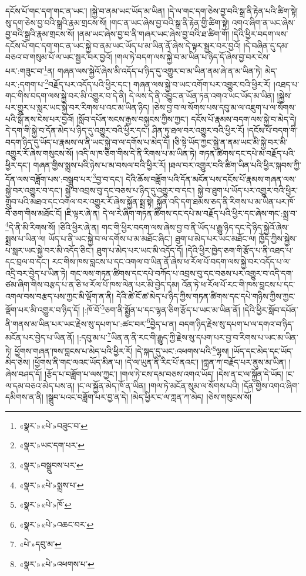 དངོས་པོ་གང་དག་གང་ན་ཡང་། །སྐྱེ་བ་ནམ་ཡང་ཡོད་མ་ཡིན། །དེ་ལ་གང་དག་ཅེས་བྱ་བའི་སྒྲ་ནི་རྟེན་པའི་ཚིག་སྟེ། སུ་དག་ཅེས་བྱ་བའི་སྒྲའི་རྣམ་གྲངས་སོ། །གང་ན་ཡང་ཞེས་བྱ་བའི་སྒྲ་ནི་རྟེན་གྱི་ཚིག་སྟེ། འགའ་ཞིག་ན་ཡང་ཞེས་བྱ་བའི་སྒྲའི་རྣམ་གྲངས་སོ། །ནམ་ཡང་ཞེས་བྱ་བ་ནི་གཞར་ཡང་ཞེས་བྱ་བའི་ཐ་ཚིག་གོ། །དེའི་ཕྱིར་བདག་ལས་དངོས་པོ་གང་དག་གང་ན་ཡང་སྐྱེ་བ་ནམ་ཡང་ཡོད་པ་མ་ཡིན་ནོ་ཞེས་དེ་ལྟར་སྦྱར་བར་བྱའོ། །དེ་བཞིན་དུ་དམ་བཅའ་བ་གསུམ་པོ་ལ་ཡང་སྦྱར་བར་བྱའོ། །གལ་ཏེ་བདག་ལས་སྐྱེ་བ་མ་ཡིན་པ་ཉིད་དོ་ཞེས་བྱ་བར་ངེས་པར་:གཟུང་བ་\footnote{«སྣར་»«པེ་»བཟུང་བ་}ན། གཞན་ལས་སྐྱེའོ་ཞེས་མི་འདོད་པ་ཉིད་དུ་འགྱུར་བ་མ་ཡིན་ནམ་ཞེ་ན་མ་ཡིན་ཏེ། མེད་པར་:དགག་པ་\footnote{«སྣར་»ཡང་དག་པར་}བརྗོད་པར་འདོད་པའི་ཕྱིར་དང་། གཞན་ལས་སྐྱེ་བ་ཡང་འགོག་པར་འགྱུར་བའི་ཕྱིར་རོ། །འཐད་པ་གང་གིས་བདག་ལས་སྐྱེ་བར་མི་འགྱུར་བ་དེ་ནི། དེ་ལས་དེ་ནི་འབྱུང་ན་ཡོན་ཏན་འགའ་ཡང་ཡོད་མ་ཡིན། །སྐྱེས་པར་གྱུར་པ་སླར་ཡང་སྐྱེ་བར་རིགས་པ་འང་མ་ཡིན་ཉིད། །ཅེས་བྱ་བ་ལ་སོགས་པས་དབུ་མ་ལ་འཇུག་པ་ལ་སོགས་པའི་སྒོ་ནས་ངེས་པར་བྱའོ། །སློབ་དཔོན་སངས་རྒྱས་བསྐྱངས་ཀྱིས་ཀྱང་། དངོས་པོ་རྣམས་བདག་ལས་སྐྱེ་བ་མེད་དེ། དེ་དག་གི་སྐྱེ་བ་དོན་མེད་པ་ཉིད་དུ་འགྱུར་བའི་ཕྱིར་དང་། ཤིན་ཏུ་ཐལ་བར་འགྱུར་བའི་ཕྱིར་རོ། །དངོས་པོ་བདག་གི་བདག་ཉིད་དུ་ཡོད་པ་རྣམས་ལ་ནི་ཡང་སྐྱེ་བ་ལ་དགོས་པ་མེད་དོ། །ཅི་སྟེ་ཡོད་ཀྱང་སྐྱེ་ན་ནམ་ཡང་མི་སྐྱེ་བར་མི་འགྱུར་རོ་ཞེས་གསུངས་སོ། །འདི་ལ་ཁ་ཅིག་གིས་དེ་ནི་རིགས་པ་མ་ཡིན་ཏེ། གཏན་ཚིགས་དང་དཔེ་མ་བརྗོད་པའི་ཕྱིར་དང་། གཞན་གྱིས་སྨྲས་པའི་ཉེས་པ་མ་བསལ་བའི་ཕྱིར་རོ། །ཐལ་བར་འགྱུར་བའི་ཚིག་ཡིན་པའི་ཕྱིར་སྐབས་ཀྱི་དོན་ལས་བཟློག་པས་:བསྒྲུབ་པར་\footnote{«སྣར་»བསྒྲུབས་པར་}བྱ་བ་དང་། དེའི་ཆོས་བཟློག་པའི་དོན་མངོན་པས་དངོས་པོ་རྣམས་གཞན་ལས་སྐྱེ་བར་འགྱུར་བ་དང་། སྐྱེ་བ་འབྲས་བུ་དང་བཅས་པ་ཉིད་དུ་འགྱུར་བ་དང་། སྐྱེ་བ་ཐུག་པ་ཡོད་པར་འགྱུར་བའི་ཕྱིར་གྲུབ་པའི་མཐའ་དང་འགལ་བར་འགྱུར་རོ་ཞེས་སྐྱོན་སྨྲ་སྟེ། སྐྱོན་འདི་དག་ཐམས་ཅད་ནི་རིགས་པ་མ་ཡིན་པར་ཁོ་བོ་ཅག་གིས་མཐོང་ངོ། །ཇི་ལྟར་ཞེ་ན། དེ་ལ་རེ་ཞིག་གཏན་ཚིགས་དང་དཔེ་མ་བརྗོད་པའི་ཕྱིར་དང་ཞེས་གང་:སྨྲ་བ་\footnote{«སྣར་»«པེ་»སྨྲས་པ་}དེ་ནི་མི་རིགས་སོ། །ཅིའི་ཕྱིར་ཞེ་ན། གང་གི་ཕྱིར་བདག་ལས་ཞེས་བྱ་བ་ནི་ཡོད་པ་རྒྱུ་ཉིད་དང་དེ་ཉིད་སྐྱེའོ་ཞེས་སྨྲས་པ་ཡིན་ལ། ཡོད་པ་ནི་ཡང་སྐྱེ་བ་ལ་དགོས་པ་མ་མཐོང་ཞིང་། ཐུག་པ་མེད་པར་ཡང་མཐོང་ལ། ཁྱོད་ཀྱིས་སྐྱེས་པ་སླར་ཡང་སྐྱེ་བར་མི་འདོད་ཅིང་། ཐུག་པ་མེད་པར་ཡང་མི་འདོད་དོ། །དེའི་ཕྱིར་ཁྱེད་ཅག་གི་རྩོད་པ་ནི་འཐད་པ་དང་བྲལ་བ་དང་། རང་གིས་ཁས་བླངས་པ་དང་འགལ་བ་ཡིན་ནོ་ཞེས་ཕ་རོལ་པོ་བདག་ལས་སྐྱེ་བར་འདོད་པ་ལ་འདྲི་བར་བྱེད་པ་ཡིན་ཏེ། གང་ལས་གཏན་ཚིགས་དང་དཔེ་བཀོད་པ་འབྲས་བུ་དང་བཅས་པར་འགྱུར་བ་འདི་དག་ཙམ་ཞིག་གིས་བརྩད་པ་ན་ཅི་ཕ་རོལ་པོ་ཁས་ལེན་པར་མི་བྱེད་དམ། འོན་ཏེ་ཕ་རོལ་པོ་རང་གི་ཁས་བླངས་པ་དང་འགལ་བས་བརྩད་པས་ཀྱང་མི་ལྡོག་ན་ནི། དེའི་ཚེ་ངོ་ཚ་མེད་པ་ཉིད་ཀྱིས་གཏན་ཚིགས་དང་དཔེ་གཉིས་ཀྱིས་ཀྱང་ལྡོག་པར་མི་འགྱུར་བ་ཉིད་དོ། །:ཁོ་བོ་\footnote{«སྣར་»«པེ་»ཁོ་}ཅག་ནི་སྨྱོན་པ་དང་ལྷན་ཅིག་རྩོད་པ་ཡང་མ་ཡིན་ནོ། །དེའི་ཕྱིར་སློབ་དཔོན་ནི་གནས་མ་ཡིན་པར་ཡང་རྗེས་སུ་དཔག་པ་:ཚང་བར་\footnote{«སྣར་»«པེ་»འཆང་བར་}བྱེད་པ་ན། བདག་ཉིད་རྗེས་སུ་དཔག་པ་ལ་དགའ་བ་ཉིད་མངོན་པར་བྱེད་པ་ཡིན་ནོ། །:དབུ་མ་པ་\footnote{«པེ་»དབུ་མ་}ཡིན་ན་ནི་རང་གི་རྒྱུད་ཀྱི་རྗེས་སུ་དཔག་པར་བྱ་བ་རིགས་པ་ཡང་མ་ཡིན་ཏེ། ཕྱོགས་གཞན་ཁས་བླངས་པ་མེད་པའི་ཕྱིར་རོ། །དེ་སྐད་དུ་ཡང་:འཕགས་པའི་\footnote{«སྣར་»«པེ་»འཕགས་པ་}ལྷས། །ཡོད་དང་མེད་དང་ཡོད་མེད་ཅེས། །ཕྱོགས་ནི་གང་ལའང་ཡོད་མིན་པ། །དེ་ལ་ཡུན་ནི་རིང་པོ་ནའང་། །ཀླན་ཀ་བརྗོད་པར་ནུས་མ་ཡིན། །ཞེས་བཤད་དོ། །རྩོད་པ་བཟློག་པ་ལས་ཀྱང་། །གལ་ཏེ་ངས་དམ་བཅས་འགའ་ཡོད། །དེས་ན་ང་ལ་སྐྱོན་དེ་ཡོད། །ང་ལ་དམ་བཅའ་མེད་པས་ན། །ང་ལ་སྐྱོན་མེད་ཁོ་ན་ཡིན། །གལ་ཏེ་མངོན་སུམ་ལ་སོགས་པའི། །དོན་གྱིས་འགའ་ཞིག་དམིགས་ན་ནི། །སྒྲུབ་པའང་བཟློག་པར་བྱ་ན་དེ། །མེད་ཕྱིར་ང་ལ་ཀླན་ཀ་མེད། །ཅེས་གསུངས་སོ། 